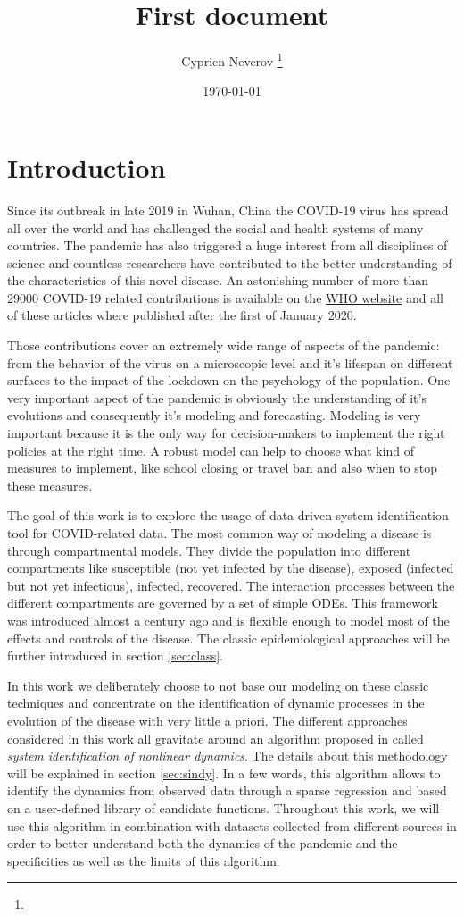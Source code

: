 \documentclass[12pt, letterpaper]{article}
\title{First document}
\author{Cyprien Neverov \thanks{}}
\date{\today}
\begin{document}
\section{Introduction}
Since its outbreak in late 2019 in Wuhan, China the COVID-19 virus has spread all over the world and has challenged the social and health systems of many countries. 
The pandemic has also triggered a huge interest from all disciplines of science and countless researchers have contributed to the better understanding of the characteristics of this novel disease. 
An astonishing number of more than 29000 COVID-19 related contributions is available on the \href{https://search.bvsalud.org/global-literature-on-novel-coronavirus-2019-ncov/}{WHO website} and all of these articles where published after the first of January 2020.

Those contributions cover an extremely wide range of aspects of the pandemic: from the behavior of the virus on a microscopic level and it's lifespan on different surfaces to the impact of the lockdown on the psychology of the population. 
One very important aspect of the pandemic is obviously the understanding of it's evolutions and consequently it's modeling and forecasting. Modeling is very important because it is the only way for decision-makers to implement the right policies at the right time. A robust model can help to choose what kind of measures to implement, like school closing or travel ban and also when to stop these measures.

The goal of this work is to explore the usage of data-driven system identification tool for COVID-related data. 
The most common way of modeling a disease is through compartmental models. They divide the population into different compartments like susceptible (not yet infected by the disease), exposed (infected but not yet infectious), infected, recovered. 
The interaction processes between the different compartments are governed by a set of simple ODEs. 
This framework was introduced almost a century ago and is flexible enough to model most of the effects and controls of the disease. The classic epidemiological approaches will be further introduced in section \ref{sec:class}.

In this work we deliberately choose to not base our modeling on these classic techniques and concentrate on the identification of dynamic processes in the evolution of the disease with very little a priori.
The different approaches considered in this work all gravitate around an algorithm proposed in \cite{sindy} called {\em system identification of nonlinear dynamics}. 
The details about this methodology will be explained in section \ref{sec:sindy}. 
In a few words, this algorithm allows to identify the dynamics from observed data through a sparse regression and based on a user-defined library of candidate functions. 
Throughout this work, we will use this algorithm in combination with datasets collected from different sources in order to better understand both the dynamics of the pandemic and the specificities as well as the limits of this algorithm. 
\end{document}
